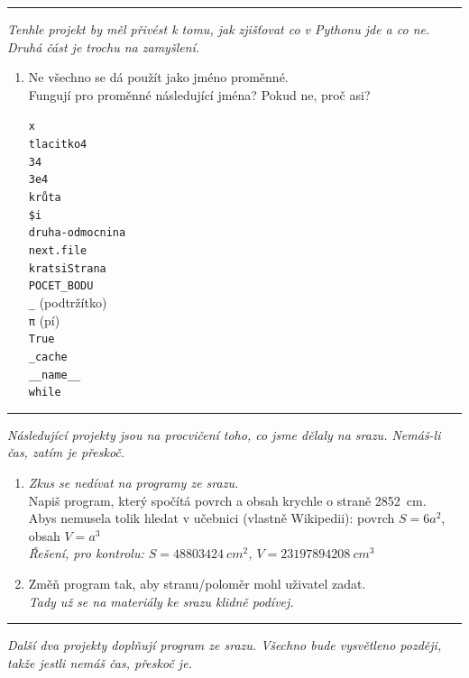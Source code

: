 \documentclass[a4paper,10pt]{article}
\newcommand\startsection[1]{
     \vspace{0.2ex}
    \hrule
    {\fontspec{Oxygen} \tiny
     \vspace{-1ex}
     \emph{#1}
     \vspace{-1.5em}
    }
}
\begin{document}
\startsection{Tenhle projekt by měl přivést k tomu, jak zjišťovat co v Pythonu jde a co ne.
Druhá část je trochu na zamyšlení.}

\begin{enumerate}[resume]
\item Ne všechno se dá použít jako jméno proměnné.
    \\Fungují pro proměnné následující jména? Pokud ne, proč asi?
    {
        \newcommand\varname[2][]{\varnameend[#1]{#2}\\[0.25cm]}
        \newcommand\varnameend[2][]{\texttt{#2} #1}
        \begin{multicols}{4}
        \varname{x}
        \varname{tlacitko4}
        \varname{34}
        \varname{3e4}
        \varname{krůta}
        \varname{\$i}
        \varname{druha-odmocnina}
        \varname{next.file}
        \varname{kratsiStrana}
        \varname{POCET\_BODU}
        \varname[(podtržítko)]{\_}
        \varname[(pí)]{\textrm{π}}
        \varname{True}
        \varname{\_cache}
        \varname{\_\_name\_\_}
        \varnameend{while}
        \end{multicols}
    }

\end{enumerate}

\startsection{Následující projekty jsou na procvičení toho, co jsme dělaly na srazu.
Nemáš-li čas, zatím je přeskoč.}

\begin{enumerate}[resume]

\item \emph{\small Zkus se nedívat na programy ze srazu.}
    \\Napiš program, který spočítá povrch a obsah krychle o straně \SI{2852}{cm}.
    \\Abys nemusela tolik hledat v učebnici (vlastně Wikipedii): povrch $S=6a^2$, obsah $V=a^3$
    \\\emph{\small Řešení, pro kontrolu: $S=\SI{48803424}{cm^2}$, $V=\SI{23197894208}{cm^3}$}

\item Změň program tak, aby stranu/poloměr mohl uživatel zadat.
    \\\emph{\small Tady už se na materiály ke srazu klidně podívej.}

\end{enumerate}

\startsection{Další dva projekty doplňují program ze srazu. Všechno bude vysvětleno později, takže jestli nemáš čas, přeskoč je.}
\end{document}
